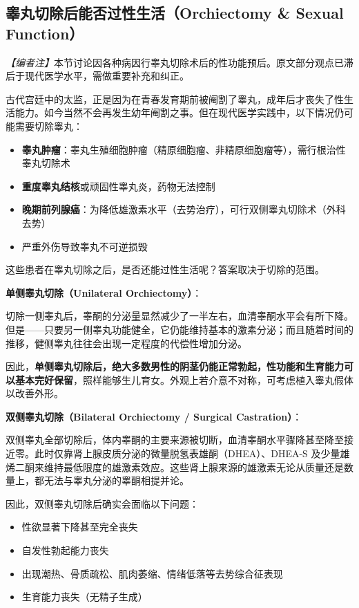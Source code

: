 \subsection{睾丸切除后能否过性生活（Orchiectomy & Sexual Function）}

\noindent\textit{【编者注】}本节讨论因各种病因行睾丸切除术后的性功能预后。原文部分观点已滞后于现代医学水平，需做重要补充和纠正。

\vspace{0.5em}
古代宫廷中的太监，正是因为在青春发育期前被阉割了睾丸，成年后才丧失了性生活能力。如今当然不会再发生幼年阉割之事。但在现代医学实践中，以下情况仍可能需要切除睾丸：
\begin{itemize}
	\item \textbf{睾丸肿瘤}：睾丸生殖细胞肿瘤（精原细胞瘤、非精原细胞瘤等），需行根治性睾丸切除术
	\item \textbf{重度睾丸结核}或顽固性睾丸炎，药物无法控制
	\item \textbf{晚期前列腺癌}：为降低雄激素水平（去势治疗），可行双侧睾丸切除术（外科去势）
	\item 严重外伤导致睾丸不可逆损毁
\end{itemize}
这些患者在睾丸切除之后，是否还能过性生活呢？答案取决于切除的范围。

\vspace{0.5em}
\noindent\textbf{单侧睾丸切除（Unilateral Orchiectomy）}：

切除一侧睾丸后，睾酮的分泌量显然减少了一半左右，血清睾酮水平会有所下降。但是——只要另一侧睾丸功能健全，它仍能维持基本的激素分泌；而且随着时间的推移，健侧睾丸往往会出现一定程度的代偿性增加分泌。

因此，\textbf{单侧睾丸切除后，绝大多数男性的阴茎仍能正常勃起，性功能和生育能力可以基本完好保留}，照样能够生儿育女。外观上若介意不对称，可考虑植入睾丸假体以改善外形。

\vspace{0.5em}
\noindent\textbf{双侧睾丸切除（Bilateral Orchiectomy / Surgical Castration）}：

双侧睾丸全部切除后，体内睾酮的主要来源被切断，血清睾酮水平骤降甚至降至接近零。此时仅靠肾上腺皮质分泌的微量脱氢表雄酮（DHEA）、DHEA-S 及少量雄烯二酮来维持最低限度的雄激素效应。这些肾上腺来源的雄激素无论从质量还是数量上，都无法与睾丸分泌的睾酮相提并论。

因此，双侧睾丸切除后确实会面临以下问题：
\begin{itemize}
	\item 性欲显著下降甚至完全丧失
	\item 自发性勃起能力丧失
	\item 出现潮热、骨质疏松、肌肉萎缩、情绪低落等去势综合征表现
	\item 生育能力丧失（无精子生成）
\end{itemize}

